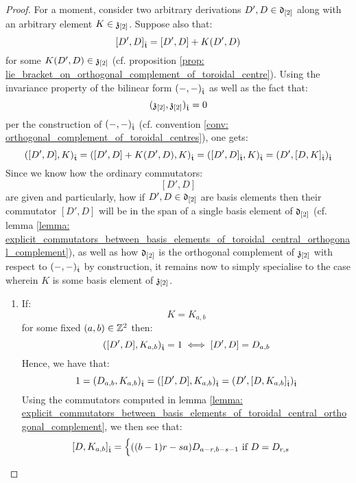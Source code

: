             \begin{proof}
                For a moment, consider two arbitrary derivations $D', D \in \d_{[2]}$ along with an arbitrary element $K \in \z_{[2]}$. Suppose also that:
                    $$[D', D]_{\extendedtoroidal} = [D', D] + K(D', D)$$
                for some $K(D', D) \in \z_{[2]}$ (cf. proposition \ref{prop: lie_bracket_on_orthogonal_complement_of_toroidal_centre}). Using the invariance property of the bilinear form $(-, -)_{\extendedtoroidal}$ as well as the fact that:
                    $$(\z_{[2]}, \z_{[2]})_{\extendedtoroidal} = 0$$
                per the construction of $(-, -)_{\extendedtoroidal}$ (cf. convention \ref{conv: orthogonal_complement_of_toroidal_centres}), one gets:
                    $$([D', D], K)_{\extendedtoroidal} = ([D', D] + K(D', D), K)_{\extendedtoroidal} = ([D', D]_{\extendedtoroidal}, K)_{\extendedtoroidal} = (D', [D, K]_{\extendedtoroidal})_{\extendedtoroidal}$$
                Since we know how the ordinary commutators:
                    $$[D', D]$$
                are given and particularly, how if $D', D \in \d_{[2]}$ are basis elements then their commutator $[D', D]$ will be in the span of a single basis element of $\d_{[2]}$ (cf. lemma \ref{lemma: explicit_commutators_between_basis_elements_of_toroidal_central_orthogonal_complement}), as well as how $\d_{[2]}$ is the orthogonal complement of $\z_{[2]}$ with respect to $(-, -)_{\extendedtoroidal}$ by construction, it remains now to simply specialise to the case wherein $K$ is some basis element of $\z_{[2]}$. 
                \begin{enumerate}
                    \item If:
                        $$K = K_{a, b}$$
                    for some fixed $(a, b) \in \Z^2$ then:
                        $$([D', D], K_{a, b})_{\extendedtoroidal} = 1 \iff [D', D] = D_{a, b}$$
                    Hence, we have that:
                        $$1 = (D_{a, b}, K_{a, b})_{\extendedtoroidal} = ([D', D], K_{a, b})_{\extendedtoroidal} = (D', [D, K_{a, b}]_{\extendedtoroidal})_{\extendedtoroidal}$$
                    Using the commutators computed in lemma \ref{lemma: explicit_commutators_between_basis_elements_of_toroidal_central_orthogonal_complement}, we then see that:
                        $$
                            [D, K_{a, b}]_{\extendedtoroidal} =
                            \begin{cases}
                                \text{$((b - 1)r - sa) D_{a - r, b - s - 1}$ if $D = D_{r, s}$}
                                \\

\end{cases}$$
\end{enumerate}
\end{proof}
